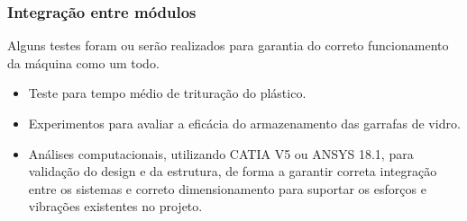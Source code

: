 \subsubsection{Integração entre módulos}

Alguns testes foram ou serão realizados para garantia do correto funcionamento da máquina como um todo.
\begin{itemize}
    \item Teste para tempo médio de trituração do plástico. 
    \item Experimentos para avaliar a eficácia do armazenamento das garrafas de vidro.
    \item Análises computacionais, utilizando CATIA V5 ou ANSYS 18.1, para validação do design e da estrutura, de forma a garantir correta integração entre os sistemas e correto dimensionamento para suportar os esforços e vibrações existentes no projeto.
\end{itemize}  
